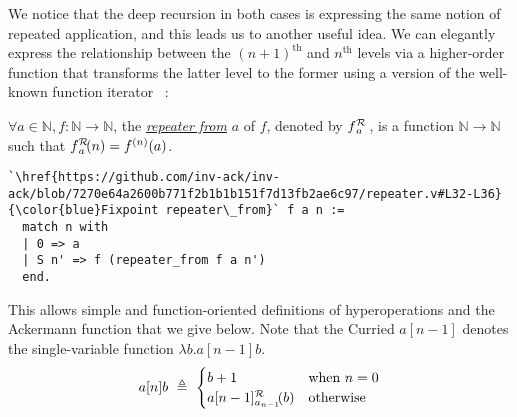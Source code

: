 We notice that the deep recursion in both cases is expressing the same notion
of repeated application, and this leads us to another useful idea. We can elegantly express the relationship
between the $(n+1)^{\text{th}}$ and $n^{\text{th}}$ levels via a higher-order function that transforms the latter level
to the former using a version of the well-known function iterator
~\cite{bertotcast}:
\begin{defn}
$\forall a\in \mathbb{N}, f: \mathbb{N}\to \mathbb{N}$, the
\href{https://github.com/inv-ack/inv-ack/blob/7270e64a2600b771f2b1b1b151f7d13fb2ae6c97/repeater.v#L32-L36}{\color{blue}\emph{repeater from}}
$a$ of $f$, denoted by $\rf{f}{a}$ , is a function $\mathbb{N}\to \mathbb{N}$ such that $\rf{f}{a}(n) = f^{(n)}(a)$.
\begin{lstlisting}
`\href{https://github.com/inv-ack/inv-ack/blob/7270e64a2600b771f2b1b1b151f7d13fb2ae6c97/repeater.v#L32-L36}{\color{blue}Fixpoint repeater\_from}` f a n :=
  match n with
  | 0 => a
  | S n' => f (repeater_from f a n') 
  end.
\end{lstlisting}
\end{defn}
\noindent This allows simple and function-oriented definitions of hyperoperations and the
Ackermann function that we give below. Note that the Curried $a[n-1]$ denotes
the single-variable function $\lambda b.a[n-1]b$.
\begin{equation*}
a[n]b ~ \triangleq ~ \begin{cases}
b + 1 & \text{when } n = 0 \\
\rf{a[n-1]}{a_{n-1}}(b) & \text{otherwise}
\end{cases}
\end{equation*}
